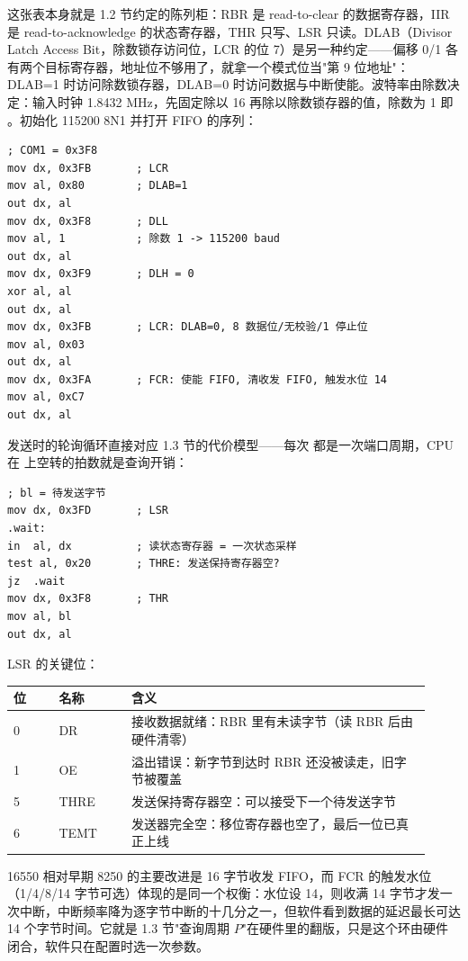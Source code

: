 这张表本身就是 1.2 节约定的陈列柜：RBR 是 read-to-clear 的数据寄存器，IIR 是 read-to-acknowledge 的状态寄存器，THR 只写、LSR 只读。DLAB（Divisor Latch Access Bit，除数锁存访问位，LCR 的位 7）是另一种约定——偏移 0/1 各有两个目标寄存器，地址位不够用了，就拿一个模式位当"第 9 位地址"：DLAB=1 时访问除数锁存器，DLAB=0 时访问数据与中断使能。波特率由除数决定：输入时钟 1.8432 MHz，先固定除以 16 再除以除数锁存器的值，除数为 1 即 。初始化 115200 8N1 并打开 FIFO 的序列：

\begin{lstlisting}
; COM1 = 0x3F8
mov dx, 0x3FB       ; LCR
mov al, 0x80        ; DLAB=1
out dx, al
mov dx, 0x3F8       ; DLL
mov al, 1           ; 除数 1 -> 115200 baud
out dx, al
mov dx, 0x3F9       ; DLH = 0
xor al, al
out dx, al
mov dx, 0x3FB       ; LCR: DLAB=0, 8 数据位/无校验/1 停止位
mov al, 0x03
out dx, al
mov dx, 0x3FA       ; FCR: 使能 FIFO, 清收发 FIFO, 触发水位 14
mov al, 0xC7
out dx, al
\end{lstlisting}

发送时的轮询循环直接对应 1.3 节的代价模型——每次  都是一次端口周期，CPU 在  上空转的拍数就是查询开销：

\begin{lstlisting}
; bl = 待发送字节
mov dx, 0x3FD       ; LSR
.wait:
in  al, dx          ; 读状态寄存器 = 一次状态采样
test al, 0x20       ; THRE: 发送保持寄存器空?
jz  .wait
mov dx, 0x3F8       ; THR
mov al, bl
out dx, al
\end{lstlisting}

LSR 的关键位：

\begin{longtable}{L{0.10\linewidth}L{0.16\linewidth}L{0.66\linewidth}}
\toprule
位 & 名称 & 含义 \\
 & DR & 接收数据就绪：RBR 里有未读字节（读 RBR 后由硬件清零） \\
1 & OE & 溢出错误：新字节到达时 RBR 还没被读走，旧字节被覆盖 \\
5 & THRE & 发送保持寄存器空：可以接受下一个待发送字节 \\
6 & TEMT & 发送器完全空：移位寄存器也空了，最后一位已真正上线 \\
\bottomrule
\end{longtable}

16550 相对早期 8250 的主要改进是 16 字节收发 FIFO，而 FCR 的触发水位（1/4/8/14 字节可选）体现的是同一个权衡：水位设 14，则收满 14 字节才发一次中断，中断频率降为逐字节中断的十几分之一，但软件看到数据的延迟最长可达 14 个字节时间。它就是 1.3 节"查询周期 $P$"在硬件里的翻版，只是这个环由硬件闭合，软件只在配置时选一次参数。

